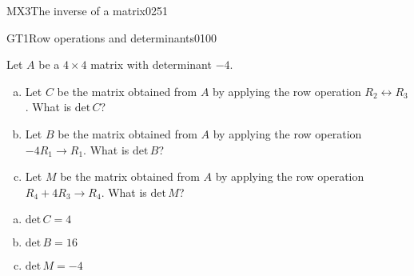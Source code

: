 \begin{exercise}{MX3}{The inverse of a matrix}{0251}
\begin{exerciseAnswer}
 \end{exerciseAnswer}
 \end{exercise}



\begin{exercise}{GT1}{Row operations and determinants}{0100} 
\begin{exerciseStatement} 

Let \(A\) be a \(4 \times 4\) matrix with determinant \(-4\).

 

\begin{enumerate}[(a)]
\item Let \(C\) be the matrix obtained from \(A\) by applying the row operation \(R_2 \leftrightarrow R_3\). What is \(\mathrm{det}\,C\)?
\item Let \(B\) be the matrix obtained from \(A\) by applying the row operation \(-4 R_1 \to R_1\). What is \(\mathrm{det}\,B\)?
\item Let \(M\) be the matrix obtained from \(A\) by applying the row operation \(R_4 + 4 R_3 \to R_4\). What is \(\mathrm{det}\,M\)?
\end{enumerate}

     \end{exerciseStatement}
 \begin{exerciseAnswer} 

\begin{enumerate}[(a)]
\item \(\mathrm{det}\,C=4\)
\item \(\mathrm{det}\,B=16\)
\item \(\mathrm{det}\,M=-4\)
\end{enumerate}

     \end{exerciseAnswer}
 \end{exercise}


\newpage




